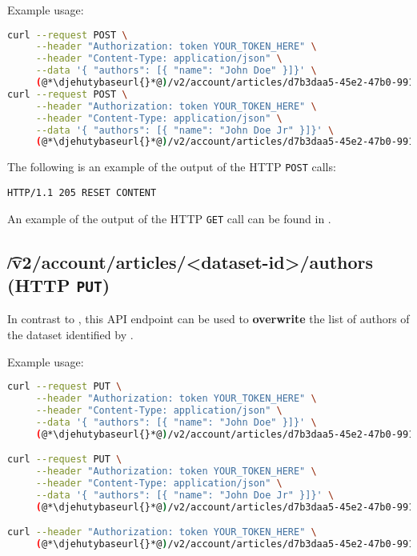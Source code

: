   Example usage:
\begin{lstlisting}[language=bash]
curl --request POST \
     --header "Authorization: token YOUR_TOKEN_HERE" \
     --header "Content-Type: application/json" \
     --data '{ "authors": [{ "name": "John Doe" }]}' \
     (@*\djehutybaseurl{}*@)/v2/account/articles/d7b3daa5-45e2-47b0-9910-0f7fa6a995b1/authors
curl --request POST \
     --header "Authorization: token YOUR_TOKEN_HERE" \
     --header "Content-Type: application/json" \
     --data '{ "authors": [{ "name": "John Doe Jr" }]}' \
     (@*\djehutybaseurl{}*@)/v2/account/articles/d7b3daa5-45e2-47b0-9910-0f7fa6a995b1/authors
\end{lstlisting}

  The following is an example of the output of the HTTP \texttt{POST} calls:
\begin{lstlisting}
HTTP/1.1 205 RESET CONTENT
\end{lstlisting}

  An example of the output of the HTTP \texttt{GET} call can be found in
  .

\subsection{\t{/v2/account/articles/<dataset-id>/authors} (HTTP \texttt{PUT})}

  In contrast to , this API endpoint
  can be used to \textbf{overwrite} the list of authors of the dataset identified
  by .

  Example usage:
\begin{lstlisting}[language=bash]
curl --request PUT \
     --header "Authorization: token YOUR_TOKEN_HERE" \
     --header "Content-Type: application/json" \
     --data '{ "authors": [{ "name": "John Doe" }]}' \
     (@*\djehutybaseurl{}*@)/v2/account/articles/d7b3daa5-45e2-47b0-9910-0f7fa6a995b1/authors

curl --request PUT \
     --header "Authorization: token YOUR_TOKEN_HERE" \
     --header "Content-Type: application/json" \
     --data '{ "authors": [{ "name": "John Doe Jr" }]}' \
     (@*\djehutybaseurl{}*@)/v2/account/articles/d7b3daa5-45e2-47b0-9910-0f7fa6a995b1/authors

curl --header "Authorization: token YOUR_TOKEN_HERE" \
     (@*\djehutybaseurl{}*@)/v2/account/articles/d7b3daa5-45e2-47b0-9910-0f7fa6a995b1 | jq
\end{lstlisting}

